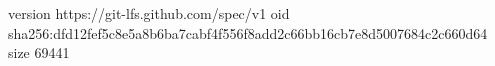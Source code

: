 version https://git-lfs.github.com/spec/v1
oid sha256:dfd12fef5c8e5a8b6ba7cabf4f556f8add2c66bb16cb7e8d5007684c2c660d64
size 69441
